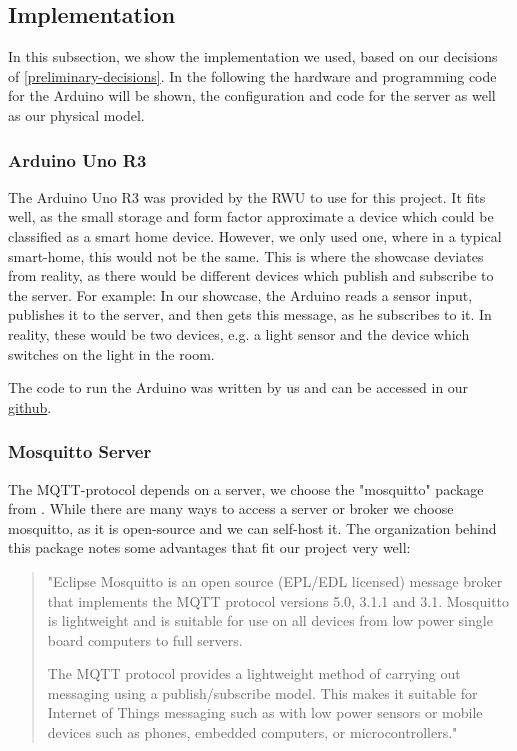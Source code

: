 \documentclass{article}
\begin{document}
\subsection{Implementation}

In this subsection, we show the implementation we used, based on our decisions of \ref{preliminary-decisions}. In the following the hardware and programming code for the Arduino will be shown, the configuration and code for the server as well as our physical model. 


\subsubsection{Arduino Uno R3}

The Arduino Uno R3 was provided by the RWU to use for this project. It fits well, as the small storage and form factor approximate a device which could be classified as a smart home device. 
However, we only used one, where in a typical smart-home, this would not be the same. This is where the showcase deviates from reality, as there would be different devices which publish and subscribe to the server. For example: In our showcase, the Arduino reads a sensor input, publishes it to the server, and then gets this message, as he subscribes to it. In reality, these would be two devices, e.g. a light sensor and the device which switches on the light in the room. 

The code to run the Arduino was written by us and can be accessed in our \href{https://github.com/rubenMiller/EventBasedSoftwareArchitecture}{github}.

\subsubsection{Mosquitto Server}
\label{mosquitto-server}

The MQTT-protocol depends on a server, we choose the "mosquitto" package from \textcite{light2017mosquitto}. While there are many ways to access a server or broker \cite{mqtt-servers-brokers} we choose mosquitto, as it is open-source and we can self-host it. The organization behind this package\cite{mosquitto} notes some advantages that fit our project very well:

\begin{quote}
"Eclipse Mosquitto is an open source (EPL/EDL licensed) message broker that implements the MQTT protocol versions 5.0, 3.1.1 and 3.1. Mosquitto is lightweight and is suitable for use on all devices from low power single board computers to full servers.

The MQTT protocol provides a lightweight method of carrying out messaging using a publish/subscribe model. This makes it suitable for Internet of Things messaging such as with low power sensors or mobile devices such as phones, embedded computers, or microcontrollers."
\end{quote}
\end{document}
